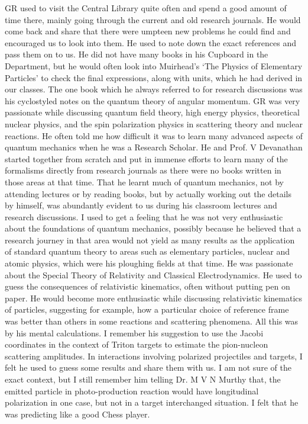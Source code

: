 GR used to visit the Central Library quite often and spend a good amount of time there, mainly going through the current and old research journals. He would come back and share that there were umpteen new problems he could find and encouraged us to look into them. He used to note down the exact references and pass them on to us. He did not have many books in his Cupboard in the Department, but he would often look into Muirhead's ‘The Physics of Elementary Particles' to check the final expressions, along with units, which he had derived in our classes. The one book which he always referred to for research discussions was his cyclostyled notes on the quantum theory of angular momentum. GR was very passionate while discussing quantum field theory, high energy physics, theoretical nuclear physics, and the spin polarization physics in scattering theory and nuclear reactions. He often told me how difficult it was to learn many advanced aspects of quantum mechanics when he was a Research Scholar. He and Prof. V Devanathan started together from scratch and put in immense efforts to learn many of the formalisms directly from research journals as there were no books written in those areas at that time. That he learnt much of quantum mechanics, not by attending lectures or by reading books, but by actually working out the details by himself, was abundantly evident to us during his classroom lectures and research discussions. I used to get a feeling that he was not very enthusiastic about the foundations of quantum mechanics, possibly because he believed that a research journey in that area would not yield as many results as the application of standard quantum theory to areas such as elementary particles, nuclear and atomic physics, which were his ploughing fields at that time. He was passionate about the Special Theory of Relativity and Classical Electrodynamics. He used to guess the consequences of relativistic kinematics, often without putting pen on paper. He would become more enthusiastic while discussing relativistic kinematics of particles, suggesting for example, how a particular choice of reference frame was better than others in some reactions and scattering phenomena. All this was by his mental calculations. I remember his suggestion to use the Jacobi coordinates in the context of Triton targets to estimate the pion-nucleon scattering amplitudes. In interactions involving polarized projectiles and targets, I felt he used to guess some results and share them with us. I am not sure of the exact context, but I still remember him telling Dr. M V N Murthy that, the emitted particle in photo-production reaction would have longitudinal polarization in one case, but not in a target interchanged situation. I felt that he was predicting like a good Chess player.

